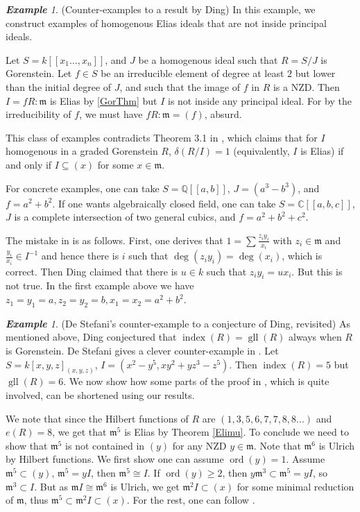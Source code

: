 \documentclass[a4paper,12pt]{amsart}
\theoremstyle{definition}
\theoremstyle{remark}
\newtheorem{example}[thm]{\bf Example}
\numberwithin{equation}{section}
\DeclareMathOperator{\ord}{{ord}}
\DeclareMathOperator{\gll}{gll}
\DeclareMathOperator{\ind}{{index}}
\def\fm{\mathfrak{m}}
\def \QQ{\mathbb Q}
\def \CC{\mathbb C}
\begin{document}
\begin{example}\label{Ding_ex}(Counter-examples to a result by Ding) In this example, we construct examples of homogenous Elias ideals that are not inside principal ideals. 

Let $S=k[[x_1\dots, x_n]]$, and $J$ be a homogenous ideal such that $R=S/J$ is Gorenstein. Let $f\in S$ be an irreducible element of degree at least $2$ but  lower than the initial degree of $J$, and such that the image of $f$ in $R$ is a NZD. Then $I=fR:\fm$ is Elias by \ref{GorThm} but $I$ is not inside any principal ideal. For by the irreducibility of $f$, we must have $fR:\fm=(f)$, absurd. 

This class of examples contradicts Theorem 3.1 in \cite{Din}, which claims that for $I$ homogenous in a graded Gorenstein $R$, $\delta(R/I)=1$ (equivalently, $I$ is Elias) if and only if $I\subseteq (x)$ for some $x\in \fm$. 

For concrete examples, one can take $S=\QQ[[a,b]]$, $J=(a^3 -b^3)$,  and $f=a^2+b^2$. If one wants algebraically closed field, one can take $S=\CC[[a,b,c]]$, $J$ is a complete intersection of two general cubics, and $f=a^2+b^2+c^2$. 

The mistake in \cite[Theorem 3.1]{Din} is as follows. First, one derives that $1=\sum \frac{z_iy_i}{x_i}$ with $z_i\in \fm$ and $\frac{y_i}{x_i}\in I^{-1}$ and hence there is $i$ such that $\deg(z_iy_i)=\deg(x_i)$, which is correct. Then Ding claimed that there is $u\in k$ such that $z_iy_i=ux_i$. But this is not true. In the first example above we have $z_1=y_1=a, z_2=y_2=b, x_1=x_2=a^2+b^2$.  
\end{example}


\begin{example}\label{DeS_ex}(De Stefani's counter-example to a conjecture of Ding, revisited) As mentioned above, Ding conjectured that $\ind(R)=\gll(R)$ always when $R$ is Gorenstein. De Stefani gives a clever counter-example in \cite{DeS}. Let $S=k[x,y,z]_{(x,y,z)}$, $I=(x^2-y^5, xy^2+yz^3-z^5)$. Then $\ind(R)=5$ but $\gll(R)=6$. We now show how some parts of the proof in  \cite{DeS}, which is quite involved, can be shortened using our results. 

We note that since the Hilbert functions of $R$ are $(1,3,5,6,7,7,8,8...)$ and $e(R)=8$, we get that $\fm^5$ is Elias  by Theorem \ref{Elimu}. To conclude we need to show that $\fm^5$ is not contained in $(y)$ for any NZD $y\in \fm$. Note that $\fm^{6}$ is Ulrich by Hilbert functions. We first show one can assume $\ord(y)=1$. Assume  $\fm^{5}\subset (y)$,  $\fm^{5}=yI$, then  
$\fm^{5}\cong I$. If $\ord(y)\geq 2$, then $y\fm^{3}\subset \fm^5=yI$, so $ \fm^{3}\subset I$. But as $\fm I\cong \fm^{6}$ is Ulrich, we get $\fm^2I\subset (x)$ for some minimal reduction of $\fm$, thus $\fm^5 \subset \fm^2I\subset (x)$. For the rest, one can follow \cite{DeS}. 

\end{example}
\end{document}

